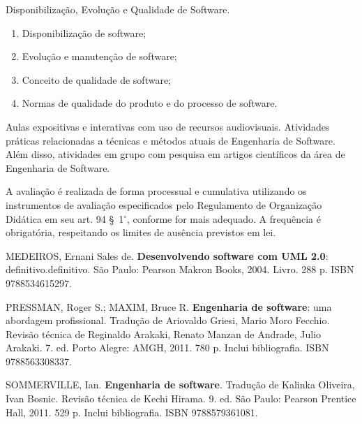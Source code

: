 \begin{pud}
\begin{description}[itemsep=0em]
         \item[UNIDADE VI:]  Disponibilização, Evolução e Qualidade de Software.
	         \begin{enumerate}[itemsep=0em, topsep=0em]
				\item Disponibilização de software;
				\item Evolução e manutenção de software;
				\item Conceito de qualidade de software;
				\item Normas de qualidade do produto e do processo de software.  
            \end{enumerate}
	\end{description}
	
	\metodologia
	Aulas expositivas e interativas com uso de recursos audiovisuais. Atividades práticas relacionadas a técnicas e métodos atuais de Engenharia de Software. Além disso, atividades em grupo com pesquisa em artigos científicos da área de Engenharia de Software.
	
	\avaliacao
	A avaliação é realizada de forma processual e cumulativa utilizando os instrumentos de avaliação especificados pelo Regulamento de Organização Didática em seu art. 94 \S~1$^\circ$, conforme for mais adequado. A frequência é obrigatória, respeitando os limites de ausência previstos em lei.
	\naopresencial
	
	\begin{bibbasica}
			
 		\item MEDEIROS, Ernani Sales de. \textbf{Desenvolvendo software com UML 2.0}: definitivo.definitivo. São Paulo:  Pearson Makron Books, 2004. Livro. 288 p. ISBN 9788534615297.  
		
 		\item PRESSMAN, Roger S.; MAXIM, Bruce R. \textbf{Engenharia de software}: uma abordagem profissional.  Tradução de Ariovaldo Griesi, Mario Moro Fecchio. Revisão técnica de Reginaldo Arakaki, Renato Manzan de Andrade, Julio Arakaki. 7. ed. Porto Alegre: AMGH, 2011. 780 p. Inclui bibliografia. ISBN 9788563308337. 
 		\item SOMMERVILLE, Ian. \textbf{Engenharia de software}. Tradução de Kalinka Oliveira, Ivan Bosnic. Revisão técnica de Kechi Hirama. 9. ed. São Paulo: Pearson Prentice Hall, 2011. 529 p. Inclui bibliografia. ISBN 9788579361081. 
 		

\end{bibbasica}
\end{pud}
